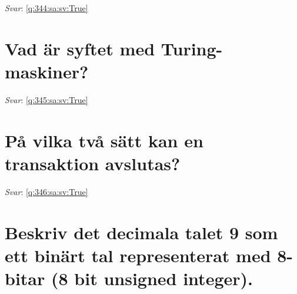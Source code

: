 \documentclass[a4paper,11pt,oneside]{book}
\begin{document}
\begin{sloppypar}
\vspace{2cm}

\noindent\makebox[\textwidth]{\hrulefill}

\vspace{1cm}

\textit{Svar}: \autoref{q:344:sa:sv:True}



\section{Vad \"ar syftet med Turing-maskiner?}

\label{q:345:sa:sv:False}

\vspace{2cm}

\noindent\makebox[\textwidth]{\hrulefill}

\vspace{1cm}

\textit{Svar}: \autoref{q:345:sa:sv:True}



\section{P\r{a} vilka tv\r{a} s\"att kan en transaktion avslutas?}

\label{q:346:sa:sv:False}

\vspace{2cm}

\noindent\makebox[\textwidth]{\hrulefill}

\vspace{1cm}

\textit{Svar}: \autoref{q:346:sa:sv:True}





















\section{Beskriv det decimala talet 9 som ett bin\"art tal representerat med 8-bitar (8 bit unsigned integer).}

\label{q:357:sa:sv:False}

\vspace{2cm}


\end{sloppypar}
\end{document}
